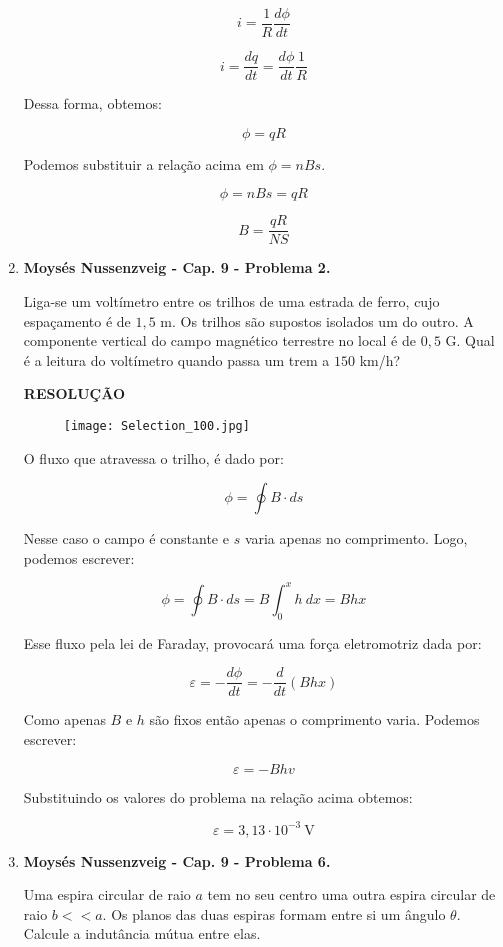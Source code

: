 \documentclass[11pt,a4paper]{article}
\begin{document}
\begin{enumerate}
$$i = \displaystyle\dfrac{1}{R}\displaystyle\dfrac{d\phi}{dt}$$

$$i = \displaystyle\dfrac{dq}{dt} = \displaystyle\dfrac{d\phi}{dt}\displaystyle\dfrac{1}{R}$$

Dessa forma, obtemos:

$$\phi = qR$$

Podemos substituir a relação acima em $\phi = n B s$.

$$\phi = n B s = q R$$

$$B = \displaystyle\dfrac{qR}{NS}$$


\item \textbf{Moysés Nussenzveig - Cap. 9 - Problema 2.}

Liga-se um voltímetro entre os trilhos de uma estrada de ferro, cujo espaçamento é de $1,5$ m. Os trilhos são supostos isolados um do outro. A componente vertical do campo magnético terrestre no local é de $0,5$ G. Qual é a leitura do voltímetro quando passa um trem a $150$ km/h?

\textbf{RESOLUÇÃO}

\begin{figure}[h]	
\centering %
\texttt{[image: Selection\_100.jpg]} 
\end{figure}

O fluxo que atravessa o trilho, é dado por:

$$\phi = \displaystyle\oint B \cdot ds $$

Nesse caso o campo é constante e $s$ varia apenas no comprimento. Logo, podemos escrever:

$$\phi = \displaystyle\oint B \cdot ds = B \displaystyle\int_0^x h \ dx = Bhx$$

Esse fluxo pela lei de Faraday, provocará uma força eletromotriz dada por:

$$\varepsilon = -\displaystyle\dfrac{d\phi}{dt} = -\displaystyle\dfrac{d}{dt}(Bhx)$$

Como apenas $B$ e $h$ são fixos então apenas o comprimento varia. Podemos escrever:

$$\varepsilon = -Bhv$$

Substituindo os valores do problema na relação acima obtemos:

$$\varepsilon = 3,13 \cdot 10^{-3} \ \textrm{V}$$

\item \textbf{Moysés Nussenzveig - Cap. 9 - Problema 6.}

Uma espira circular de raio $a$ tem no seu centro uma outra espira circular de raio $b << a$. Os planos das duas espiras formam entre si um ângulo $\theta$. Calcule a indutância mútua entre elas.


\end{enumerate}
\end{document}

